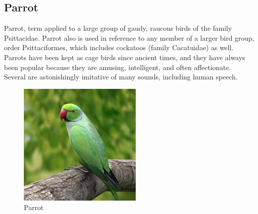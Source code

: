 \subsection{Parrot}
Parrot, term applied to a large group of gaudy, raucous birds of the family Psittacidae. Parrot also is used in reference to any member of a larger bird group, order Psittaciformes, which includes cockatoos (family Cacatuidae) as well. Parrots have been kept as cage birds since ancient times, and they have always been popular because they are amusing, intelligent, and often affectionate. Several are astonishingly imitative of many sounds, including human speech.
\begin{figure}[htp]
    \centering
    \includegraphics{images (6).jpeg}
    \caption{Parrot}
\end{figure}